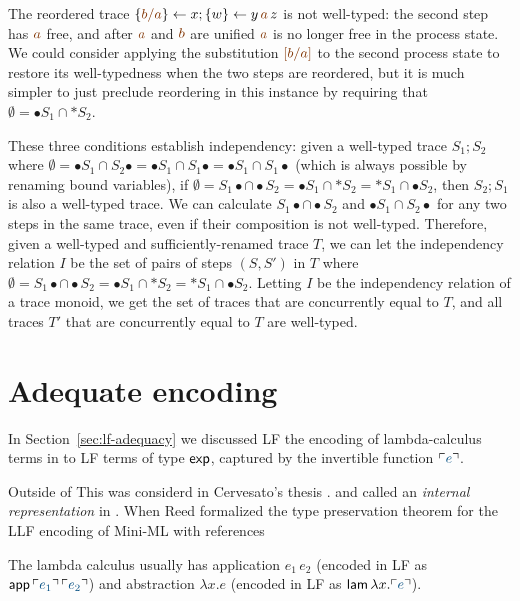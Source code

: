 The reordered trace $\trstep{\lf{b/a}}{x}; \trstep{w}{y\,\lf{a}\,z}$
is not well-typed: the second step has $\lf{a}$ free, and after
$\lf{a}$ and $\lf{b}$ are unified $\lf{a}$ is no longer free in the
process state.  We could consider applying the substitution
$\lf{[b/a]}$ to the second process state to restore its well-typedness
when the two steps are reordered, but it is much simpler to just
preclude reordering in this instance by requiring that 
$\emptyset = {\bullet}S_1 \cap {\ast}S_2$.

These three conditions establish independency: given a well-typed
trace $S_1; S_2$ where $\emptyset = {\bullet}S_1 \cap S_2{\bullet} =
{\bullet}S_1 \cap S_1{\bullet} = {\bullet}S_1 \cap S_1{\bullet}$
(which is always possible by renaming bound variables), if $\emptyset
= S_1{\bullet} \cap {\bullet}S_2 = {\bullet}S_1 \cap {\ast}S_2 =
{\ast}S_1 \cap {\bullet}S_2$, then $S_2; S_1$ is also a well-typed
trace.  We can calculate $S_1{\bullet} \cap {\bullet}S_2$ and
${\bullet}S_1 \cap S_2{\bullet}$ for any two steps in the same trace,
even if their composition is not well-typed. Therefore, given a
well-typed and sufficiently-renamed trace $T$, we can let the
independency relation $I$ be the set of pairs of steps $(S, S')$ in
$T$ where $\emptyset = S_1{\bullet} \cap {\bullet}S_2 = {\bullet}S_1
\cap {\ast}S_2 = {\ast}S_1 \cap {\bullet}S_2$. Letting $I$ be the
independency relation of a trace monoid, we get the set of traces that
are concurrently equal to $T$, and all traces $T'$ that are
concurrently equal to $T$ are well-typed.

\section{Adequate encoding}
\label{sec:sls-adequate}

In Section~\ref{sec:lf-adequacy} we discussed LF the encoding of
lambda-calculus terms in to LF terms of type ${\sf exp}$, captured
by the invertible function $\interp{e}$. 

Outside of 
This was considerd in Cervesato's thesis \cite{}.  and called an 
{\it internal representation} in \cite{cervesato02linear}.
When Reed formalized the type preservation theorem for the LLF encoding
of Mini-ML with references 

The lambda calculus usually has application $e_1\,e_2$ (encoded in LF
as ${\sf app}\,\interp{e_1}\,\interp{e_2}$) and abstraction $\lambda
x.e$ (encoded in LF as ${\sf lam}\,\lambda x. \interp{e}$).

